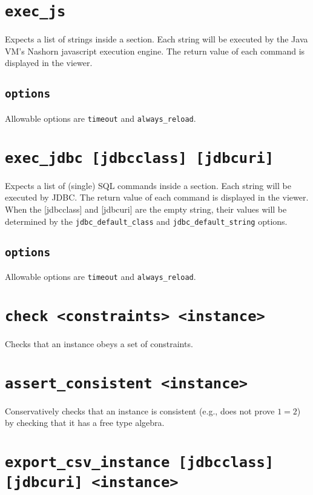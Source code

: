 \documentclass[10pt]{book}
\begin{document}
\section{{\tt exec\_js}} 
Expects a list of strings inside a section.  Each string will be executed by the Java VM's Nashorn javascript execution engine.  The return value of each command is displayed in the viewer.

\subsection{{\tt options}}

Allowable options are {\tt timeout} and {\tt always\_reload}.

\section{{\tt exec\_jdbc [jdbcclass] [jdbcuri]}}
Expects a list of (single) SQL commands inside a section.  Each string will be executed by JDBC.  The return value of each command is displayed in the viewer.  When the [jdbcclass] and [jdbcuri] are the empty string, their values will be determined by the {\tt jdbc\_default\_class} and {\tt jdbc\_default\_string} options.

\subsection{{\tt options}}

Allowable options are {\tt timeout} and {\tt always\_reload}.

\section{{\tt check <constraints> <instance>}}

Checks that an instance obeys a set of constraints.

\section{{\tt assert\_consistent <instance>}}

Conservatively checks that an instance is consistent (e.g., does not prove $1=2$) by checking that it has a free type algebra.


\section{{\tt export\_csv\_instance [jdbcclass] [jdbcuri] <instance>}} 
\end{document}
